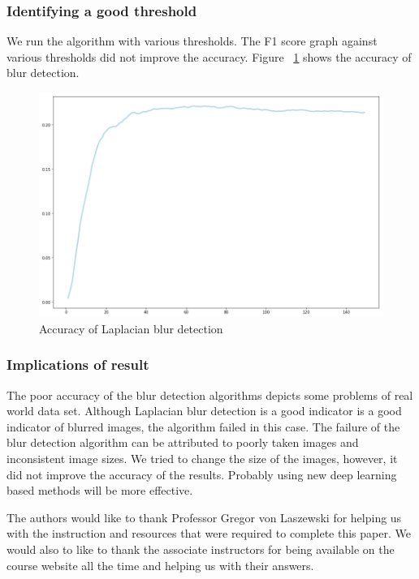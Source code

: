 \documentclass[sigconf]{acmart}
\begin{document}
\subsubsection{Identifying a good threshold} We run the algorithm with various thresholds. The F1 score graph against various thresholds did not improve the accuracy. Figure ~\ref{fig:accuracy} shows the accuracy of blur detection.
\begin{figure}[hbp]
        \centering
        
        \includegraphics[width=\columnwidth]{images/f1.png}  
        \caption{Accuracy of Laplacian blur detection } 
          \label{fig:accuracy}   
      
        
\end{figure}
\subsubsection{Implications of result} The poor accuracy of the blur detection algorithms depicts some problems of real world data set. Although Laplacian blur detection is a good indicator is a good indicator of blurred images, the algorithm failed in this case. The failure of the blur detection algorithm can be attributed to poorly taken images and inconsistent image sizes. We tried to change the size of the images, however, it did not improve the accuracy of the results. Probably using new deep learning based methods will be more effective. 

\begin{acks}

The authors would like to thank Professor Gregor von Laszewski for helping us with the instruction and resources that were required to complete this paper. We would also to like to thank the associate instructors for being available on the course website all the time and helping us with their answers.

\end{acks}
\end{document}
